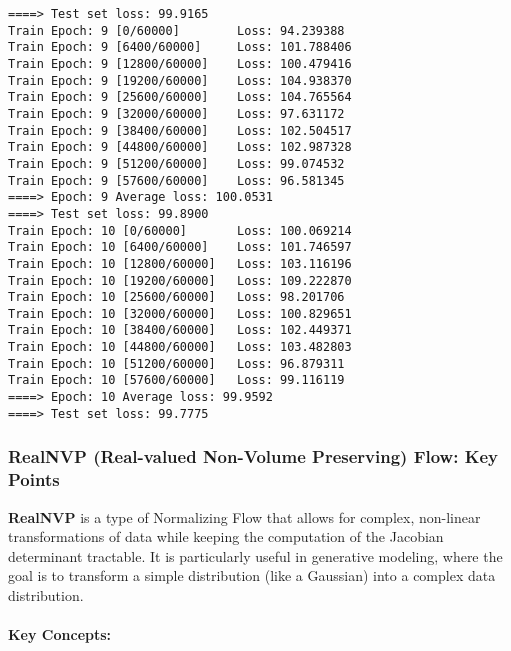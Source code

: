 \documentclass[11pt]{article}
\begin{document}
\begin{Verbatim}[commandchars=\\\{\}]
====> Test set loss: 99.9165
Train Epoch: 9 [0/60000]        Loss: 94.239388
Train Epoch: 9 [6400/60000]     Loss: 101.788406
Train Epoch: 9 [12800/60000]    Loss: 100.479416
Train Epoch: 9 [19200/60000]    Loss: 104.938370
Train Epoch: 9 [25600/60000]    Loss: 104.765564
Train Epoch: 9 [32000/60000]    Loss: 97.631172
Train Epoch: 9 [38400/60000]    Loss: 102.504517
Train Epoch: 9 [44800/60000]    Loss: 102.987328
Train Epoch: 9 [51200/60000]    Loss: 99.074532
Train Epoch: 9 [57600/60000]    Loss: 96.581345
====> Epoch: 9 Average loss: 100.0531
====> Test set loss: 99.8900
Train Epoch: 10 [0/60000]       Loss: 100.069214
Train Epoch: 10 [6400/60000]    Loss: 101.746597
Train Epoch: 10 [12800/60000]   Loss: 103.116196
Train Epoch: 10 [19200/60000]   Loss: 109.222870
Train Epoch: 10 [25600/60000]   Loss: 98.201706
Train Epoch: 10 [32000/60000]   Loss: 100.829651
Train Epoch: 10 [38400/60000]   Loss: 102.449371
Train Epoch: 10 [44800/60000]   Loss: 103.482803
Train Epoch: 10 [51200/60000]   Loss: 96.879311
Train Epoch: 10 [57600/60000]   Loss: 99.116119
====> Epoch: 10 Average loss: 99.9592
====> Test set loss: 99.7775
    \end{Verbatim}

    \subsubsection{RealNVP (Real-valued Non-Volume Preserving) Flow: Key
Points}\label{realnvp-real-valued-non-volume-preserving-flow-key-points}

\textbf{RealNVP} is a type of Normalizing Flow that allows for complex,
non-linear transformations of data while keeping the computation of the
Jacobian determinant tractable. It is particularly useful in generative
modeling, where the goal is to transform a simple distribution (like a
Gaussian) into a complex data distribution.

\paragraph{Key Concepts:}\label{key-concepts}
\end{document}
